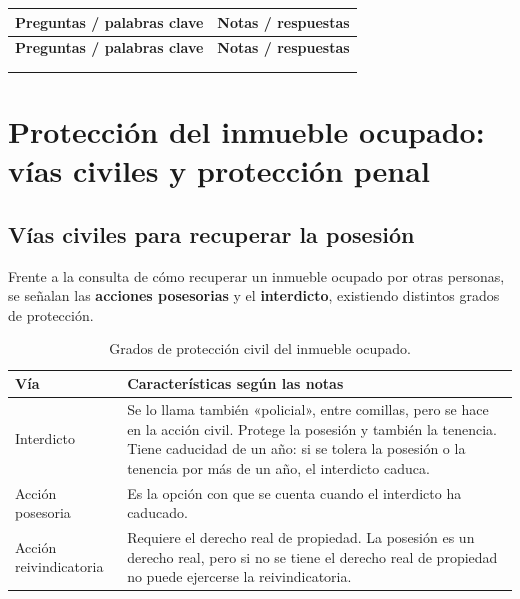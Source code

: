 \documentclass[12pt,oneside]{book}
\newlength{\cornellizq}
\newlength{\cornellder}
\newenvironment{cornell}
{\begin{longtable}{>{\columncolor{gray!10}\raggedright\arraybackslash}p{\cornellizq}>{\raggedright\arraybackslash}p{\cornellder}}
\toprule
\textbf{Preguntas / palabras clave} & \textbf{Notas / respuestas} \\
\midrule
\endfirsthead
\toprule
\textbf{Preguntas / palabras clave} & \textbf{Notas / respuestas} \\
\midrule
\endhead
\midrule
\multicolumn{2}{r}{\footnotesize\itshape Continúa en la página siguiente} \\
\endfoot
\endlastfoot}
{\end{longtable}}
\begin{document}
\begin{cornell}
\multicolumn{2}{>{\raggedright\arraybackslash}p{\dimexpr\cornellizq+\cornellder+2\tabcolsep\relax}}{%
\textbf{Resumen.} En reclamos con múltiples damnificados es necesario atravesar el proceso para sincerar las pretensiones y evaluar hasta dónde alcanza el seguro. La pluspetición inexcusable consiste en exacerbar el reclamo y puede generar responsabilidad del abogado aun con beneficio de litigar sin gastos. La prudencia apunta a la reparación, no al enriquecimiento sin causa. El Código Civil sigue la reparación plena. La incapacidad puede ser más onerosa que la muerte. El seguro de responsabilidad civil busca mantener indemne al asegurado. La obsolescencia puede ser programada o percibida.} \\
\bottomrule
\end{cornell}

\chapter[Protección del inmueble ocupado]{Protección del inmueble ocupado: vías civiles y protección penal}

\section{Vías civiles para recuperar la posesión}

Frente a la consulta de cómo recuperar un inmueble ocupado por otras personas, se señalan las \textbf{acciones posesorias} y el \textbf{interdicto}, existiendo distintos grados de protección.

\begin{table}[H]
\centering
\begin{tabularx}{\textwidth}{
    >{\raggedright\arraybackslash}p{}
    >{\raggedright\arraybackslash}X
}
\toprule
\textbf{Vía} & \textbf{Características según las notas} \\
\midrule
Interdicto &
Se lo llama también «policial», entre comillas, pero se hace en la acción civil. Protege la posesión y también la tenencia. Tiene caducidad de un año: si se tolera la posesión o la tenencia por más de un año, el interdicto caduca. \\
\addlinespace
Acción posesoria &
Es la opción con que se cuenta cuando el interdicto ha caducado. \\
\addlinespace
Acción reivindicatoria &
Requiere el derecho real de propiedad. La posesión es un derecho real, pero si no se tiene el derecho real de propiedad no puede ejercerse la reivindicatoria. \\
\bottomrule
\end{tabularx}
\caption*{Grados de protección civil del inmueble ocupado.}
\end{table}
\end{document}
